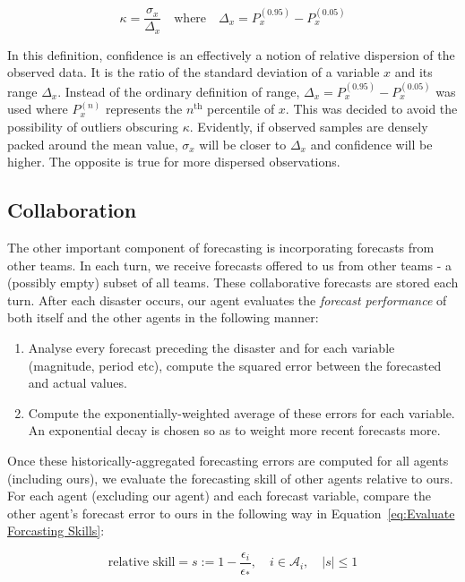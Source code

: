 \begin{equation}
\kappa = \frac{\sigma_x}{\Delta_x} \quad \text{where} \quad \Delta_x = P_x^{(0.95)}-P_x^{(0.05)}
\label{eq: Forecast Confidence}
\end{equation}

In this definition, confidence is an effectively a notion of relative dispersion of the observed data. It is the ratio of the standard deviation of a variable $x$ and its range $\Delta_x$. Instead of the ordinary definition of range, $\Delta_x = P_x^{(0.95)}-P_x^{(0.05)}$ was used where $ P_x^{(n)}$ represents the $n^{\text{th}}$ percentile of $x$. This was decided to avoid the possibility of outliers obscuring $\kappa$. Evidently, if observed samples are densely packed around the mean value, $\sigma_x$ will be closer to $\Delta_x$ and confidence will be higher. The opposite is true for more dispersed observations.

\subsection{Collaboration}
The other important component of forecasting is incorporating forecasts from other teams. In each turn, we receive forecasts offered to us from other teams - a (possibly empty) subset of all teams. These collaborative forecasts are stored each turn. After each disaster occurs, our agent evaluates the \textit{forecast performance} of both itself and the other agents in the following manner:
\begin{enumerate}
    \item Analyse every forecast preceding the disaster and for each variable (magnitude, period etc), compute the squared error between the forecasted and actual values. 
    \item Compute the exponentially-weighted average of these errors for each variable. An exponential decay is chosen so as to weight more recent forecasts more. 
\end{enumerate}

Once these historically-aggregated forecasting errors are computed for all agents (including ours), we evaluate the forecasting skill of other agents relative to ours. For each agent (excluding our agent) and each forecast variable, compare the other agent's forecast error to ours in the following way in Equation~\ref{eq:Evaluate Forcasting Skills}:

\begin{equation}
\text{relative skill} = s := 1-\frac{\epsilon_i}{\epsilon_*},\quad i \in \mathcal{A}_i, \quad |s| \leq 1
\label{eq:Evaluate Forcasting Skills}
\end{equation}

